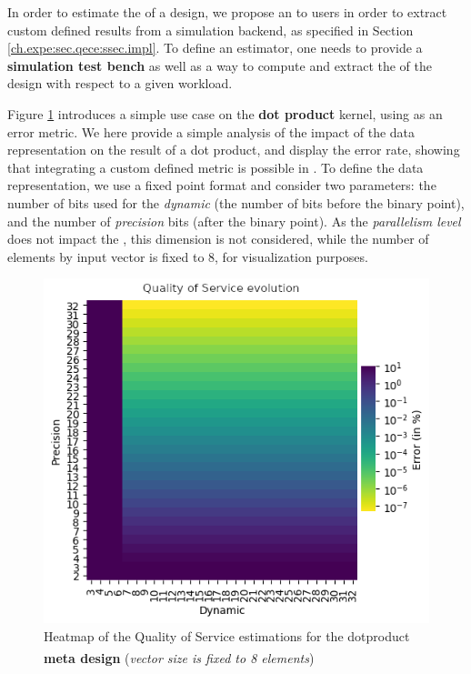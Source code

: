         In order to estimate the  of a design, we propose an  to users in order to extract custom defined results from a simulation backend, as specified in Section \ref{ch.expe:sec.qece:ssec.impl}.
        To define an estimator, one needs to provide a {\bf simulation test bench} as well as a way to compute and extract the  of the design with respect to a given workload.%

        Figure \ref{ch.expe:sec.estimators:ssec.qos:fig.qos} introduces a simple use case on the {\bf dot product} kernel, using  as an error metric.
        We here provide a simple analysis of the impact of the data representation on the result of a dot product, and display the error rate, showing that integrating a custom defined  metric is possible in .
        To define the data representation, we use a fixed point format and consider two parameters: the number of bits used for the {\it dynamic} (\ie the number of bits before the binary point), and the number of {\it precision} bits (\ie after the binary point).
        As the {\it parallelism level} does not impact the , this dimension is not considered, while the number of elements by input vector is fixed to 8, for visualization purposes.

\clearpage
        \begin{figure}[h!]
            \centering
            \includegraphics[width=1.0\textwidth]{Figures/results/qosEstimation.png}
            \caption[Quality of Service estimations on dot product]{Heatmap of the Quality of Service estimations for the dot\newline product {\bf meta design}\textsuperscript{\styx} ({\it vector size is fixed to 8 elements})}
            \label{ch.expe:sec.estimators:ssec.qos:fig.qos}
        \end{figure}


